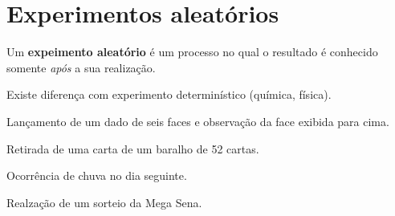 \section{Experimentos aleatórios}

\begin{definition}
    Um \textbf{expeimento aleatório} é um processo no qual o resultado
    é conhecido somente \textit{após} a sua realização.
\end{definition}
\begin{obs}
    Existe diferença com experimento determinístico (química, física).
\end{obs}

\begin{example}\label{exp:ch01-experimento-1}
    Lançamento de um dado de seis faces e observação da face
    exibida para cima.
\end{example}

\begin{example}\label{exp:ch01-experimento-2}
    Retirada de uma carta de um baralho de 52 cartas.
\end{example}

\begin{example}\label{exp:ch01-experimento-3}
    Ocorrência de chuva no dia seguinte.
\end{example}

\begin{example}\label{exp:ch01-experimento-4}
    Realzação de um sorteio da Mega Sena.
\end{example}

